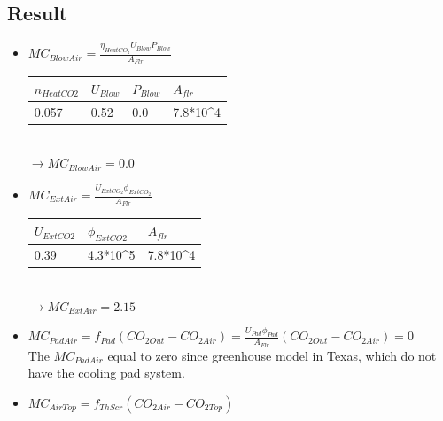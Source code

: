 \documentclass[a4paper]{article}
\numberwithin{equation}{section}
\begin{document}
	\subsection{Result}
	\begin{itemize}
\item $MC_{BlowAir} = \frac{\eta_{HeatCO_2}U_{Blow}P_{Blow}}{A_{Flr}}$
\begin{table}[h]
\centering
\begin{tabular}{|l|l|l|l|}
\hline
\rowcolor[HTML]{FFFC9E} 
\textbf{$n_{HeatCO2}$} & \textbf{$U_{Blow}$} & \textbf{$P_{Blow}$}            & \textbf{$A_{flr}$}             \\ \hline
0.057             & 0.52           & 0.0 & 7.8*10\textasciicircum{}4 \\ \hline
\end{tabular}
\end{table}\\
$\rightarrow MC_{BlowAir} = 0.0$ 
\item $ MC_{ExtAir} = \frac{U_{ExtCO_2}\phi_{ExtCO_2}}{A_{Flr}}$
\begin{table}[h]
\centering
\begin{tabular}{|l|l|l|}
\hline
\rowcolor[HTML]{FFFC9E} 
\textbf{$U_{ExtCO2}$} & \textbf{$\phi_{ExtCO2}$}              & \textbf{$A_{flr}$}             \\ \hline
0.39        & 4.3*10\textasciicircum{}5 & 7.8*10\textasciicircum{}4 \\ \hline
\end{tabular}
\end{table}\\
$\rightarrow MC_{ExtAir}  = 2.15$
\item $ MC_{PadAir}  = f_{Pad} (CO_{2 Out} - CO_{2 Air}) 
     = \frac{U_{Pad} \phi_{Pad}}{A_{Flr}} (CO_{2 Out} - CO_{2 Air}) = 0$\\
The $MC_{PadAir}$ equal to zero since greenhouse model in Texas, which do not have the cooling pad system. 
\item $   MC_{AirTop} = f_{ThScr} (CO_{2 Air} - CO_{2 Top})$\\


\end{itemize}
\end{document}
